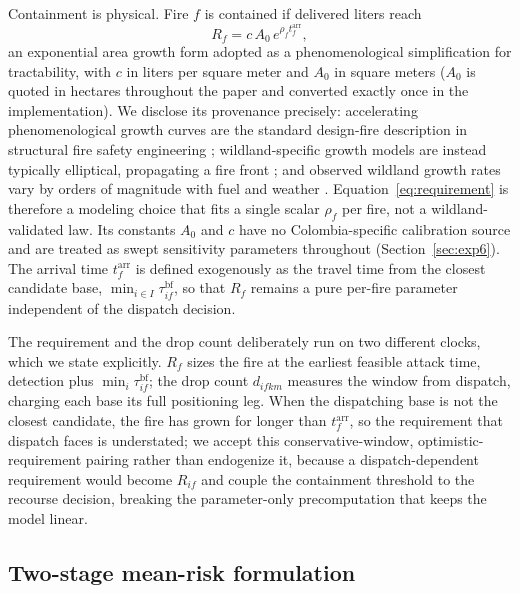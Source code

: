 \documentclass[11pt]{article}
\begin{document}
Containment is physical. Fire $f$ is contained if delivered liters
reach
\begin{equation}
R_f = c\, A_0\, e^{\rho_f t^{\mathrm{arr}}_f},
\label{eq:requirement}
\end{equation}
an exponential area growth form adopted as a phenomenological
simplification for tractability, with $c$ in liters per square meter
and $A_0$ in square meters ($A_0$ is quoted in hectares throughout the
paper and converted exactly once in the implementation). We disclose
its provenance precisely: accelerating phenomenological growth curves
are the standard design-fire description in structural fire safety
engineering \citep{nilsson2014}; wildland-specific growth models are
instead typically elliptical, propagating a fire front
\citep{sullivan2009}; and observed wildland growth rates vary by
orders of magnitude with fuel and weather \citep{balch2024}.
Equation~\eqref{eq:requirement} is therefore a modeling choice that
fits a single scalar $\rho_f$ per fire, not a wildland-validated law. Its
constants $A_0$ and $c$ have no Colombia-specific calibration source
and are treated as swept sensitivity parameters throughout
(Section~\ref{sec:exp6}). The arrival time $t^{\mathrm{arr}}_f$ is
defined exogenously as the travel time from the closest candidate base,
$\min_{i \in I} \tau^{\mathrm{bf}}_{if}$, so that $R_f$ remains a pure
per-fire parameter independent of the dispatch decision.

The requirement and the drop count deliberately run on two different
clocks, which we state explicitly. $R_f$ sizes the fire at the
earliest feasible attack time, detection plus $\min_i
\tau^{\mathrm{bf}}_{if}$; the drop count $d_{ifkm}$ measures the
window from dispatch, charging each base its full positioning leg.
When the dispatching base is not the closest candidate, the fire has
grown for longer than $t^{\mathrm{arr}}_f$, so the requirement that
dispatch faces is understated; we accept this conservative-window,
optimistic-requirement pairing rather than endogenize it, because a
dispatch-dependent requirement would become $R_{if}$ and couple the
containment threshold to the recourse decision, breaking the
parameter-only precomputation that keeps the model linear.

\subsection{Two-stage mean-risk formulation}
\label{sec:milp}
\end{document}
